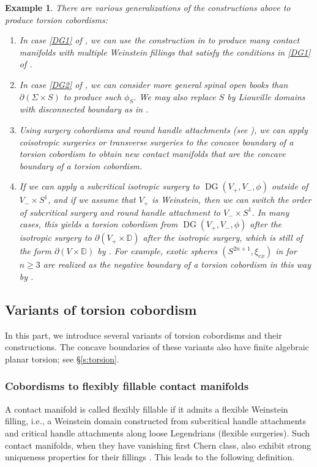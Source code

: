 \documentclass[11pt]{amsart}
\numberwithin{equation}{section}
\newtheorem{example}[theorem]{\textbf{Example}}
\def\D{{\mathbb D}}
\DeclareMathOperator{\DG}{DG}
\begin{document}
\begin{example}\label{ex:generalization}
   There are various generalizations of the constructions above to produce torsion cobordisms:
   \begin{enumerate}
       \item In case \eqref{DG1} of , we can use the construction in \cite{zbMATH07197504} to produce many contact manifolds with multiple Weinstein fillings that satisfy the conditions in \eqref{DG1} of .  
       \item In case \eqref{DG2} of , we can consider more general spinal open books than $\partial(\Sigma \times S)$ to produce such $\phi_S$. We may also replace $S$ by Liouville domains with disconnected boundary as in \cite[Theorem C]{MNW}.
       \item Using surgery cobordisms and round handle attachments (see ), we can apply coisotropic surgeries or transverse surgeries to the concave boundary of a torsion cobordism to obtain new contact manifolds that are the concave boundary of a torsion cobordism. 
       \item\label{surgery} If we can apply a subcritical isotropic surgery to $\DG(V_+,V_-,\phi)$ outside of $V_-\times S^1$, and if we assume that $V_+$ is Weinstein, then we can switch the order of subcritical surgery and round handle attachment to $V_-\times S^1$. In many cases, this yields a torsion cobordism from $\DG(V_+,V_-,\phi)$ after the isotropic surgery to $\partial(V_+\times \D)$ after the isotropic surgery, which is still of the form $\partial(V\times \D)$ by \cite[Theorem 14.16]{CieEli}. For example, exotic spheres $(S^{2n+1},\xi_{ex})$ in \cite{bowden2022tight} for $n\ge 3$ are realized as the negative boundary of a torsion cobordism in this way by \cite[Proposition 2.13]{bowden2022tight}.
   \end{enumerate}
\end{example}




\subsection{Variants of torsion cobordism}
In this part, we introduce several variants of torsion cobordisms and their constructions. The concave boundaries of these variants also have finite algebraic planar torsion; see \S \ref{s:torsion}.

\subsubsection{Cobordisms to flexibly fillable contact manifolds}
A contact manifold is called flexibly fillable if it admits a flexible Weinstein filling, i.e., a Weinstein domain constructed from subcritical handle attachments and critical handle attachments along loose Legendrians (flexible surgeries). Such contact manifolds, when they have vanishing first Chern class, also exhibit strong uniqueness properties for their fillings \cite{zbMATH07367119,zbMATH07706508,intersection}. This leads to the following definition.
\end{document}
